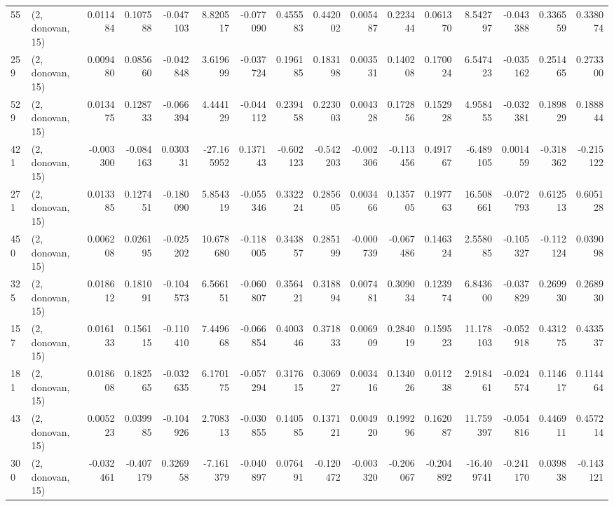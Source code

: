 \begin{tabular}{llrrrrrrrrrrrrrr}
55  &  (2, donovan, 15) &   0.011484 &  0.107588 & -0.047103 &    8.820517 & -0.077090 &   0.455583 &   0.442002 &  0.005487 &  0.223444 &  0.061370 &    8.542797 & -0.043388 &   0.336559 &   0.338074 \\
259 &  (2, donovan, 15) &   0.009480 &  0.085660 & -0.042848 &    3.619699 & -0.037724 &   0.196185 &   0.183198 &  0.003531 &  0.140208 &  0.170024 &    6.547423 & -0.035162 &   0.251465 &   0.273300 \\
529 &  (2, donovan, 15) &   0.013475 &  0.128733 & -0.066394 &    4.444129 & -0.044112 &   0.239458 &   0.223003 &  0.004328 &  0.172856 &  0.152928 &    4.958455 & -0.032381 &   0.189829 &   0.188844 \\
421 &  (2, donovan, 15) &  -0.003300 & -0.084163 &  0.030331 &  -27.165952 &  0.137143 &  -0.602123 &  -0.542203 & -0.002306 & -0.113456 &  0.491767 &   -6.489105 &  0.001459 &  -0.318362 &  -0.215122 \\
271 &  (2, donovan, 15) &   0.013385 &  0.127451 & -0.180090 &    5.854319 & -0.055346 &   0.332224 &   0.285605 &  0.003466 &  0.135705 &  0.197763 &   16.508661 & -0.072793 &   0.612513 &   0.605128 \\
450 &  (2, donovan, 15) &   0.006208 &  0.026195 & -0.025202 &   10.678680 & -0.118005 &   0.343857 &   0.285199 & -0.000739 & -0.067486 &  0.146324 &    2.558085 & -0.105327 &  -0.112124 &   0.039098 \\
325 &  (2, donovan, 15) &   0.018612 &  0.181091 & -0.104573 &    6.566151 & -0.060807 &   0.356421 &   0.318894 &  0.007481 &  0.309034 &  0.123974 &    6.843600 & -0.037829 &   0.269930 &   0.268930 \\
157 &  (2, donovan, 15) &   0.016133 &  0.156115 & -0.110410 &    7.449668 & -0.066854 &   0.400346 &   0.371833 &  0.006909 &  0.284019 &  0.159523 &   11.178103 & -0.052918 &   0.431275 &   0.433537 \\
181 &  (2, donovan, 15) &   0.018608 &  0.182565 & -0.032635 &    6.170175 & -0.057294 &   0.317615 &   0.306927 &  0.003416 &  0.134026 &  0.011238 &    2.918461 & -0.024574 &   0.114617 &   0.114464 \\
43  &  (2, donovan, 15) &   0.005223 &  0.039985 & -0.104926 &    2.708313 & -0.030855 &   0.140585 &   0.137121 &  0.004920 &  0.199296 &  0.162087 &   11.759397 & -0.054816 &   0.446911 &   0.457214 \\
300 &  (2, donovan, 15) &  -0.032461 & -0.407179 &  0.326958 &   -7.161379 & -0.040897 &   0.076491 &  -0.120472 & -0.003320 & -0.206067 & -0.204892 &  -16.409741 & -0.241170 &   0.039838 &  -0.143121 \\

\end{tabular}
